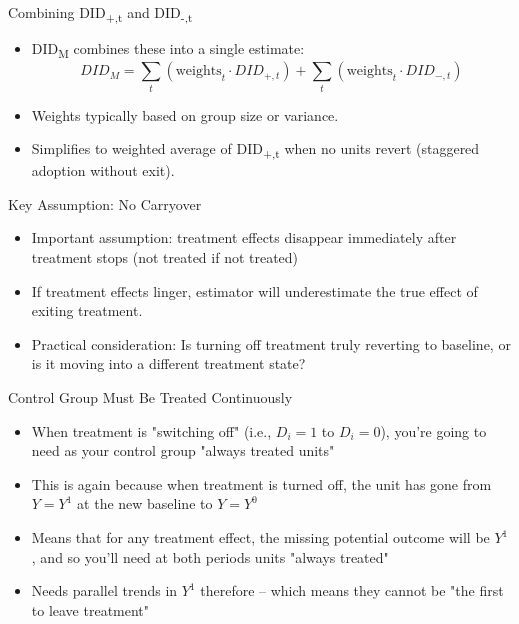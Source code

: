 \documentclass{beamer}
\begin{document}
\begin{frame}{Combining DID\textsubscript{+,t} and DID\textsubscript{-,t}}
\begin{itemize}
\item DID\textsubscript{M} combines these into a single estimate:
\[
DID_M = \sum_t \left(\text{weights}_t \cdot DID_{+,t}\right) + \sum_t \left(\text{weights}_t \cdot DID_{-,t}\right)
\]
\item Weights typically based on group size or variance.
\item Simplifies to weighted average of DID\textsubscript{+,t} when no units revert (staggered adoption without exit).
\end{itemize}
\end{frame}

\begin{frame}{Key Assumption: No Carryover}
\begin{itemize}
\item Important assumption: treatment effects disappear immediately after treatment stops (not treated if not treated)
\item If treatment effects linger, estimator will underestimate the true effect of exiting treatment.
\item Practical consideration: Is turning off treatment truly reverting to baseline, or is it moving into a different treatment state?
\end{itemize}
\end{frame}

\begin{frame}{Control Group Must Be Treated Continuously}
\begin{itemize}
\item When treatment is "switching off" (i.e., $D_i=1$ to $D_i=0$), you're going to need as your control group "always treated units"
\item This is again because when treatment is turned off, the unit has gone from $Y=Y^1$ at the new baseline to $Y=Y^0$
\item Means that for any treatment effect, the missing potential outcome will be $Y^1$, and so you'll need at both periods units "always treated" 
\item Needs parallel trends in $Y^1$ therefore -- which means they cannot be "the first to leave treatment" 
\end{itemize}
\end{frame}
\end{document}
